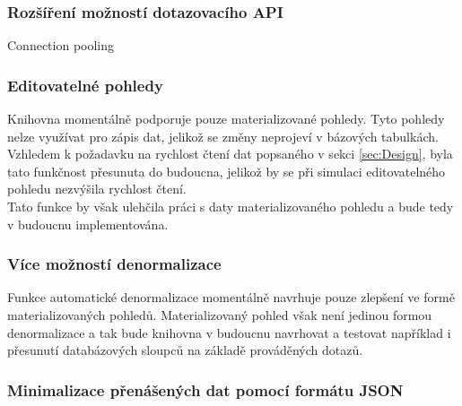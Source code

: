 \documentclass[ing,male,java,dept456]{diploma}						%
\begin{document}
\subsubsection{Rozšíření možností dotazovacího API}

Connection pooling

\subsubsection{Editovatelné pohledy}

Knihovna momentálně podporuje pouze materializované pohledy. Tyto pohledy nelze využívat pro zápis dat, jelikož se změny neprojeví v bázových tabulkách. Vzhledem k požadavku na rychlost čtení dat popsaného v sekci \ref{sec:Design}, byla tato funkčnost přesunuta do budoucna, jelikož by se při simulaci editovatelného pohledu nezvýšila rychlost čtení. \\
Tato funkce by však ulehčila práci s daty materializovaného pohledu a bude tedy v budoucnu implementována.

\subsubsection{Více možností denormalizace}

Funkce automatické denormalizace momentálně navrhuje pouze zlepšení ve formě materializovaných pohledů. Materializovaný pohled však není jedinou formou denormalizace a tak bude knihovna v budoucnu navrhovat a testovat například i přesunutí databázových sloupců na základě prováděných dotazů.

\subsubsection{Minimalizace přenášených dat pomocí formátu JSON}
\end{document}
